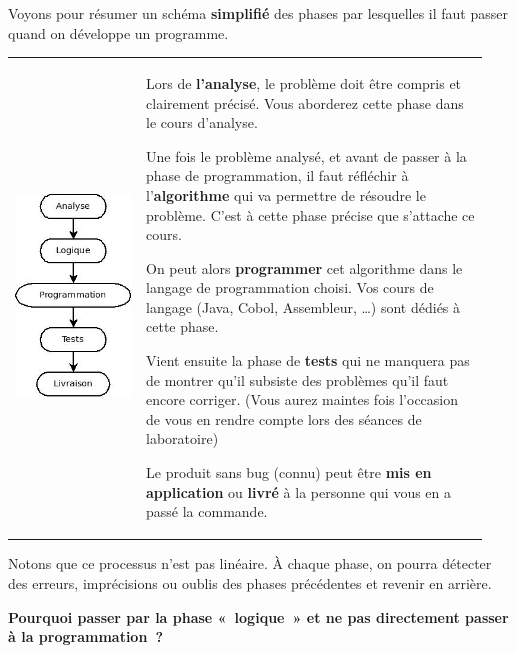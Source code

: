 	Voyons pour résumer un schéma \textbf{simplifié} des phases par
	lesquelles il faut passer quand on développe un programme.

	\begin{tabular}{m{0.26\linewidth}m{0.68\linewidth}}
	\includegraphics[width=3.5cm]{image/intro-phases-develop}
	&
	\begin{liste}
	\item 
		Lors de \textbf{l’analyse}, le problème doit être
		compris et clairement précisé. Vous aborderez cette phase dans le cours
		d’analyse.
	\item
		Une fois le problème analysé, et avant de passer à la phase de
		programmation, il faut réfléchir à l’\textbf{algorithme} qui va
		permettre de résoudre le problème. C’est à cette phase précise
		que s’attache ce cours.
	\item
		On peut alors \textbf{programmer} cet algorithme dans le langage de
		programmation choisi. Vos cours de langage (Java, Cobol, 
		Assembleur, \dots) sont dédiés à cette phase.
	\item
		Vient ensuite la phase de \textbf{tests} qui ne manquera pas de montrer
		qu’il subsiste des problèmes qu’il
		faut encore corriger. (Vous aurez maintes fois
		l’occasion de vous en rendre compte lors des
		séances de laboratoire)
	\item
		Le produit sans bug (connu) peut être \textbf{mis en application}
		ou \textbf{livré} à la personne qui vous en a passé la commande.
	\end{liste}
	\\
	\end{tabular}
	
	Notons que ce processus n’est pas linéaire. À chaque
	phase, on pourra détecter des erreurs, imprécisions ou oublis des
	phases précédentes et revenir en arrière.

	\textbf{Pourquoi passer par la phase «~logique~» 
		et ne pas directement passer à la programmation~?}
	
